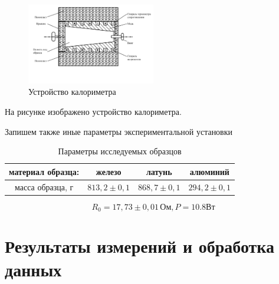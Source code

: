 \documentclass[12pt,a4paper]{article}
\begin{document}
	\begin{figure}[h!]
		\begin{center}
			\includegraphics[width = 0.5\textwidth]{2.1.4_2}
			\caption{Устройство калориметра}
			\label{fig:Ris_of_facility}
		\end{center}
	\end{figure}

	На рисунке изображено устройство калориметра.
	
	Запишем также иные параметры экспериментальной установки
	
	\begin{table}[h!]
		\centering
		\begin{tabular}{|c|c|c|c|}
			\hline
			материал образца: & железо          & латунь          & алюминий        \\ \hline
			масса образца, г  & $813,2 \pm 0,1$ & $868,7 \pm 0,1$ & $294,2 \pm 0,1$ \\ \hline
		\end{tabular}
		\caption{Параметры исследуемых образцов}
		\label{tab:param_of_facility}
	\end{table}
	
	$$R_{0} = 17,73 \pm 0,01 \, \text{Ом}, P = 10.8\text{Вт}$$

\newpage

\section{Результаты измерений и обработка данных}
\end{document}
